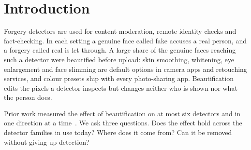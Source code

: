 
\begin{abstract}
A genuine face that was beautified by a camera app, an AR filter or a retouching service still shows the same person doing
the same thing, but a forgery detector may not treat it that way. We score seventeen published detectors on six
beautification sources with one rule and find one failure shared by all of them: a skin-smoothed genuine face is scored as
more forged than the same face untouched, in 89--99\% of pairs for fifteen detectors, and smoothing the skin alone is enough.
We then show where the cue comes from. With architecture, data and recipe fixed, the class that receives smoothed views
during training sets the sign of the error: views on genuine faces only let nearly every smoothed forgery through, views on
forged faces only accuse smoothed genuine faces, and views on both sit in between. From this we derive a training rule,
smoothing-invariant consistency (SIC): one smoothing operator drawn identically for both classes and a penalty on the change
of the forgery logit under it. SIC lowers the false alarm on skin-smoothed genuine faces from [[FA before]]\% to
[[FA after]]\% while leaving untreated detection within the confidence interval of the same model trained without it
([[AUC on Celeb-DF-v2]] on Celeb-DF-v2). We release the six sources, the scorer and the paired reader as a benchmark.
\end{abstract}

\section{Introduction}
Forgery detectors are used for content moderation, remote identity checks and fact-checking. In each setting a genuine face
called fake accuses a real person, and a forgery called real is let through. A large share of the genuine faces reaching
such a detector were beautified before upload: skin smoothing, whitening, eye enlargement and face slimming are default
options in camera apps and retouching services, and colour presets ship with every photo-sharing app. Beautification edits
the pixels a detector inspects but changes neither who is shown nor what the person does.

Prior work measured the effect of beautification on at most six detectors and in one direction at a
time~\cite{libourel2024,saeed2025,concas2025}. We ask three questions. Does the effect hold across the detector families
in use today? Where does it come from? Can it be removed without giving up detection?

